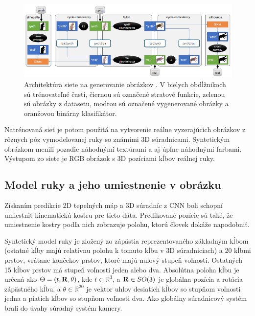 \begin{figure}[H]
	\begin{center}
		\includegraphics[width=\textwidth]{images/GenerateHands.png}
		\caption{Architektúra siete na generovanie obrázkov \cite{GANeratedHands_CVPR2018}. V bielych obdĺžnikoch sú trénovateľné časti, čiernou sú označené stratové funkcie, zelenou sú obrázky z datasetu, modrou sú označené vygenerované obrázky a oranžovou binárny klasifikátor.}
		\label{img:generateHands}
	\end{center}
\end{figure}

Natrénovaná sieť je potom použitá na vytvorenie reálne vyzerajúcich obrázkov z rôznych póz vymodelovanej ruky so známimi 3D súradnicami. Syntetickým obrázkom menili pozadie náhodnými textúrami a aj úplne náhodnými farbami. Výstupom zo siete je RGB obrázok s 3D pozíciami kĺbov reálnej ruky.

\subsection{Model ruky a jeho umiestnenie v obrázku}
Získaním predikcie 2D tepelných máp a 3D súradníc z CNN boli schopní \cite{GANeratedHands_CVPR2018} umiestniť kinematickú kostru pre tieto dáta. Predikované pozície sú také, že umiestnenie kostry podľa nich zobrazuje polohu, ktorú človek dokáže napodobniť.

Syntetický model ruky je zložený zo zápästia reprezentovaného základným kĺbom (ostatné kĺby majú relatívnu polohu k tomuto kĺbu v 3D súradniciach) a 20 kĺbmi prstov, vrátane končekov prstov, ktoré majú nulový stupeň voľnosti. Ostatných 15 kĺbov prstov má stupeň voľnosti jeden alebo dva. Absolútna poloha kĺbu je určená ako $\Theta = (t, {\bf R}, \theta)$, kde $t \in \mathbb{R}^3$, a ${\bf R} \in SO(3)$ je globálna pozícia a rotácia zápästného kĺbu, a $\theta \in \mathbb{R}^{20}$ je vektor uhlov desiatich kĺbov so stupňom voľnosti jedna a piatich kĺbov so stupňom voľnosti dva. Ako globálny súradnicový systém brali do úvahy súradný systém kamery.

